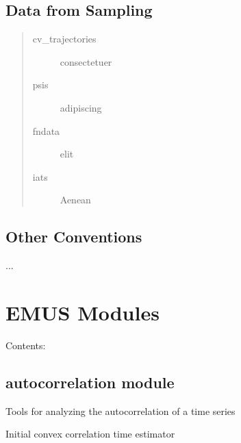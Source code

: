 \documentclass[letterpaper,10pt,english]{sphinxmanual}
\begin{document}
\section{Data from Sampling}
\label{datastructures:data-from-sampling}\begin{quote}\begin{description}
\item[{cv\_trajectories}] \leavevmode
consectetuer

\item[{psis}] \leavevmode
adipiscing

\item[{fndata}] \leavevmode
elit

\item[{iats}] \leavevmode
Aenean

\end{description}\end{quote}


\section{Other Conventions}
\label{datastructures:other-conventions}
...


\chapter{EMUS Modules}
\label{modules/index::doc}\label{modules/index:emus-modules}
Contents:


\section{autocorrelation module}
\label{modules/autocorrelation::doc}\label{modules/autocorrelation:autocorrelation-module}\label{modules/autocorrelation:module-autocorrelation}
Tools for analyzing the autocorrelation of a time series

\begin{fulllineitems}
\label{modules/autocorrelation:autocorrelation.autocorrfxn}
\end{fulllineitems}


\begin{fulllineitems}
\label{modules/autocorrelation:autocorrelation.icce}
Initial convex correlation time estimator

\end{fulllineitems}
\end{document}
